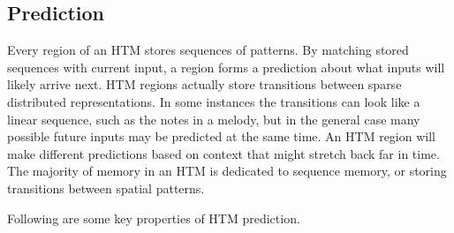 \documentclass{report}
\begin{document}
\subsection*{Prediction}

Every region of an HTM stores sequences of patterns. By matching
stored sequences with current input, a region forms a prediction about
what inputs will likely arrive next. HTM regions actually store
transitions between sparse distributed representations. In some
instances the transitions can look like a linear sequence, such as the
notes in a melody, but in the general case many possible future inputs
may be predicted at the same time. An HTM region will make different
predictions based on context that might stretch back far in time. The
majority of memory in an HTM is dedicated to sequence memory, or
storing transitions between spatial patterns.

Following are some key properties of HTM prediction.
\end{document}
